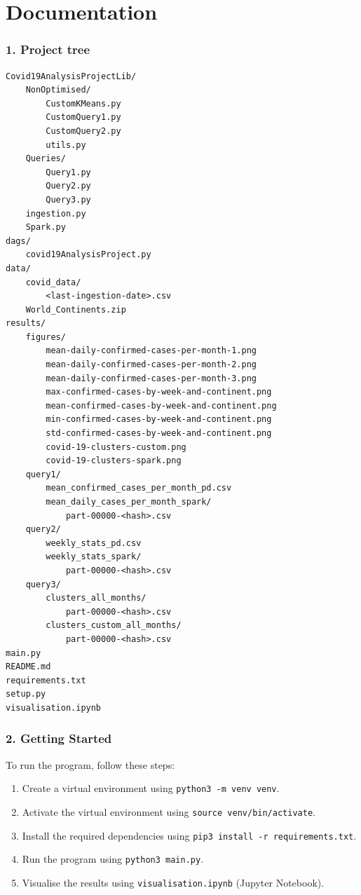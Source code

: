 \documentclass[12pt,oneside]{book} %
\begin{document}



\appendix

\chapter{Documentation}
\subsection*{1. Project tree}

\begin{lstlisting}[breaklines=true, basicstyle=\small]
Covid19AnalysisProjectLib/
    NonOptimised/
        CustomKMeans.py
        CustomQuery1.py
        CustomQuery2.py
        utils.py
    Queries/
        Query1.py
        Query2.py
        Query3.py
    ingestion.py
    Spark.py
dags/
    covid19AnalysisProject.py
data/
    covid_data/
        <last-ingestion-date>.csv
    World_Continents.zip
results/
    figures/
        mean-daily-confirmed-cases-per-month-1.png
        mean-daily-confirmed-cases-per-month-2.png
        mean-daily-confirmed-cases-per-month-3.png
        max-confirmed-cases-by-week-and-continent.png
        mean-confirmed-cases-by-week-and-continent.png
        min-confirmed-cases-by-week-and-continent.png
        std-confirmed-cases-by-week-and-continent.png
        covid-19-clusters-custom.png
        covid-19-clusters-spark.png
    query1/
        mean_confirmed_cases_per_month_pd.csv
        mean_daily_cases_per_month_spark/
            part-00000-<hash>.csv
    query2/
        weekly_stats_pd.csv
        weekly_stats_spark/
            part-00000-<hash>.csv
    query3/
        clusters_all_months/
            part-00000-<hash>.csv
        clusters_custom_all_months/
            part-00000-<hash>.csv
main.py
README.md
requirements.txt
setup.py
visualisation.ipynb
\end{lstlisting}

\subsection*{2. Getting Started}
To run the program, follow these steps:
\begin{enumerate}
    \itemindent=17.87pt
    \item Create a virtual environment using \texttt{python3 -m venv venv}.
    \item Activate the virtual environment using \texttt{source venv/bin/activate}.
    \item Install the required dependencies using \texttt{pip3 install -r
              requirements.txt}.
    \item Run the program using \texttt{python3 main.py}.
    \item Visualise the results using \texttt{visualisation.ipynb} (Jupyter Notebook).
\end{enumerate}
\end{document}
